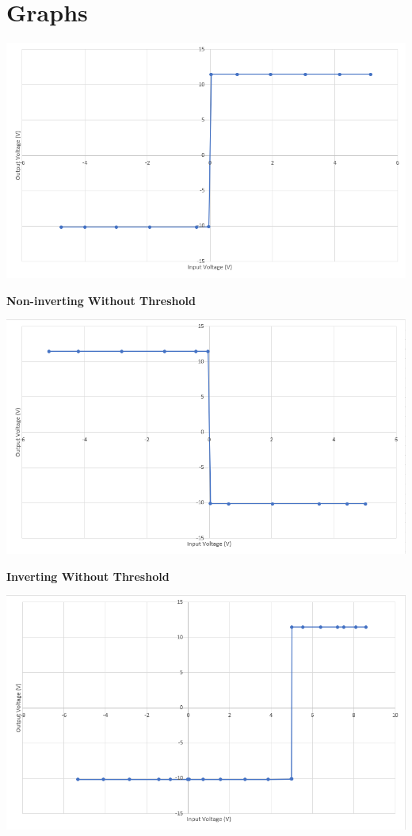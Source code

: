 \section{Graphs}
\begin{center}
    \includegraphics[scale = 0.7]{OPAMP Apps/noninvwothres.png}
\end{center}
\begin{center}
    \textbf{Non-inverting Without Threshold}
\end{center}
\begin{center}
    \includegraphics[scale = 0.7]{OPAMP Apps/invwothres.png}
\end{center}
\begin{center}
    \textbf{Inverting Without Threshold}
\end{center}
\clearpage
\begin{center}
    \includegraphics[scale = 0.7]{OPAMP Apps/noninvthres.png}
\end{center}
